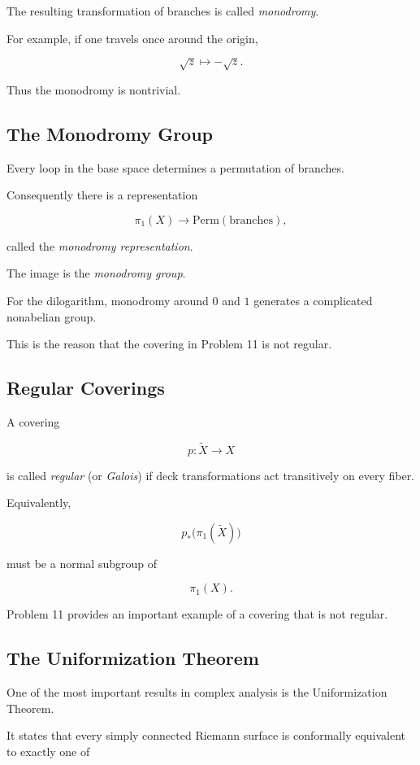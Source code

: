 \documentclass[12pt,a4paper]{article}
\theoremstyle{notespace}
\begin{document}
The resulting transformation of branches is called \emph{monodromy}.

\medskip

For example, if one travels once around the origin,

\[
\sqrt z
\longmapsto
-\sqrt z.
\]

Thus the monodromy is nontrivial.

\subsection{The Monodromy Group}

Every loop in the base space determines a permutation of branches.

Consequently there is a representation

\[
\pi_1(X)
\longrightarrow
\mathrm{Perm}(\text{branches}),
\]

called the \emph{monodromy representation}.

The image is the \emph{monodromy group}.

For the dilogarithm, monodromy around \(0\) and \(1\) generates a complicated nonabelian group.

This is the reason that the covering in Problem 11 is not regular.

\subsection{Regular Coverings}

A covering

\[
p:\widetilde X\to X
\]

is called \emph{regular} (or \emph{Galois}) if deck transformations act transitively on every fiber.

Equivalently,

\[
p_*\bigl(\pi_1(\widetilde X)\bigr)
\]

must be a normal subgroup of

\[
\pi_1(X).
\]

Problem 11 provides an important example of a covering that is not regular.

\subsection{The Uniformization Theorem}

One of the most important results in complex analysis is the Uniformization Theorem.

It states that every simply connected Riemann surface is conformally equivalent to exactly one of
\end{document}
